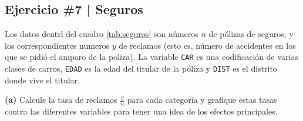 \newpage

\begin{myblock}
\section*{Ejercicio \#7 | Seguros}

Los datos dentrl del cuadro \ref{tab:seguros} son números $n$ de pólizas de seguros, y los correspondientes
numeros $y$ de reclamos (esto es, número de accidentes en los que se pidió el amparo de la poliza). La
variable \texttt{CAR} es una codificación de varias clases de carros, \texttt{EDAD} es la edad del 
titular de la póliza y \texttt{DIST} es el distrito donde vive el titular.

\textbf{(a)} Calcule la tasa de reclamos $\frac{y}{n}$ para cada categoría y grafique estas tasas contra 
las diferentes variables para tener una idea de los efectos principales. 

\end{myblock}


